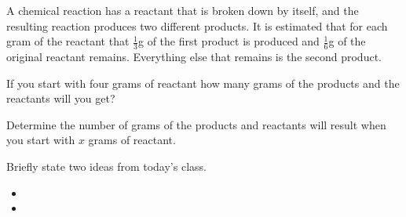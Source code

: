 
\begin{problem}
\item A chemical reaction has a reactant that is broken down by
  itself, and the resulting reaction produces two different
  products. It is estimated that for each gram of the reactant that
  $\frac{1}{3}$g of the first product is produced and $\frac{1}{6}$g
  of the original reactant remains. Everything else that remains is
  the second product.
  \begin{subproblem}
  \item If you start with four grams of reactant how many grams of the
    products and the reactants will you get?
    \vfill
  \item Determine the number of grams of the products and reactants
    will result when you start with  $x$ grams of reactant.
    \vfill
  \end{subproblem}
\end{problem}


\begin{problem}
\item 
  \begin{subproblem}
    \item
  \end{subproblem}
\end{problem}

\postClass

\begin{problem}
\item Briefly state two ideas from today's class.
  \begin{itemize}
  \item 
  \item 
  \end{itemize}
\item 
  \begin{subproblem}
    \item
  \end{subproblem}
\end{problem}

